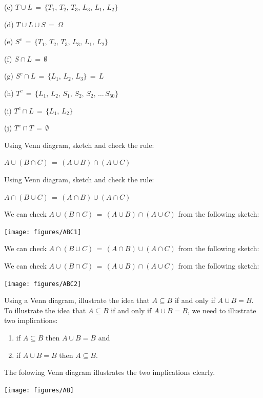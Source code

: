 \begin{ExerciseList}
{\item[(c)] $T \cup L\,=\, \{ T_1,\,T_2,\, T_3,\, L_3,\, L_1,\, L_2\}$

\item[(d)] $T \cup L \cup S\,=\, \Omega$

\item[(e)] $S^c \,=\,\{ T_1,\,T_2,\, T_3,\, L_3,\, L_1,\, L_2\} $

\item[(f)] $S \cap L\,=\, \emptyset$

\item[(g)] $S^c\cap L\,=\,\{L_1,\, L_2,\,L_3\}\,=\, L $

\item[(h)] $T^c\,=\,\{L_1,\, L_2,\,S_1,\, S_2,\, S_2,\,\dots \, S_{50}\}  $

\item[(i)] $T^c \cap L\,=\,\{L_1,\, L_2\} $


\item[(j)] $T^c\cap T\,=\, \emptyset$

\ee\ecols
}

\Exercise
Using Venn diagram, sketch and check the rule:

$A\cup(B\cap C)\,=\,(A\cup B)\cap (A\cup C)$

\Exercise
Using Venn diagram, sketch and check the rule:

$A\cap(B\cup C)\,=\,(A\cap B)\cup(A\cap C)$

\Answer
We can check $A\cup(B\cap C)\,=\,(A\cup B)\cap (A\cup C)$ from the following sketch:

\begin{center}
{\texttt{[image: figures/ABC1]}}
\end{center}

\Answer
We can check $A\cap(B\cup C)\,=\,(A\cap B)\cup(A\cap C)$ from the following sketch:

We can check $A\cup(B\cap C)\,=\,(A\cup B)\cap (A\cup C)$ from the following sketch:
\begin{center}
{\texttt{[image: figures/ABC2]}}
\end{center}


\Exercise
Using a Venn diagram, illustrate the idea that  $A\subseteq B$ if and only if $A\cup B=B$.
\Answer
To illustrate the idea that $A\subseteq B$ if and only if $A\cup B=B$, we need to illustrate two implications:
\begin{enumerate}
\item if $A\subseteq B$ then  $A\cup B=B$ and
\item if  $A\cup B=B$ then $A\subseteq B$.
\end{enumerate}
The folowing Venn diagram illustrates the two implications clearly.
\begin{center}
\texttt{[image: figures/AB]}
\end{center}


\end{ExerciseList}

